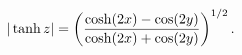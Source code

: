\[|\mathop{\tanh\/}\nolimits z|=\left(\frac{\mathop{\cosh\/}\nolimits\!\left(2x%
\right)-\mathop{\cos\/}\nolimits\!\left(2y\right)}{\mathop{\cosh\/}\nolimits\!%
\left(2x\right)+\mathop{\cos\/}\nolimits\!\left(2y\right)}\right)^{1/2}.\]